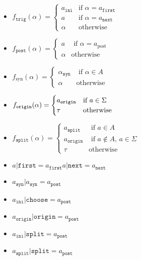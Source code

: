 \documentclass[../hons_project.tex]{subfiles}
\begin{document}
\begin{multicols}{2}
	\begin{itemize}[leftmargin=*]
		\item $f_{\mathtt{trig}}(\alpha) = \begin{cases}
				      a_{\mathtt{ini}} & \text{if } \alpha = a_{\mathtt{first}} \\
				      a                & \text{if } \alpha = a_{\mathtt{next}}  \\
				      \alpha           & \text{otherwise}
			      \end{cases}$

		\item $f_{\mathtt{post}}(\alpha) = \begin{cases}
				      a      & \text{ if } \alpha = a_{\mathrm{post}} \\
				      \alpha & \text{otherwise}
			      \end{cases}$

		\item $f_{\mathrm{syn}}(\alpha) = \begin{cases}
				      \alpha_{\mathtt{syn}} & \text{ if } \alpha\in A \\
				      \alpha                & \text{otherwise}
			      \end{cases}$

		\item $f_{\mathtt{origin}}(\alpha) = \begin{cases}
				      a_{\mathtt{origin}} & \text{if } a\in\Sigma \\
				      \tau                & \text{otherwise}
			      \end{cases}$
		\item $f_{\mathtt{split}}(\alpha) = \begin{cases}
				      a_{\mathtt{split}}  & \text{ if } a\in A                    \\
				      a_{\mathtt{origin}} & \text{ if } a\not\in A,\, a\in \Sigma \\
				      \tau                & \mathrm{otherwise}
			      \end{cases}$
	\end{itemize}
\end{multicols}
\begin{multicols}{3}
	\begin{itemize}[leftmargin=*]
		\item $a | \mathtt{first} = a_{\mathtt{first}}$\newline $a | \mathtt{next} = a_{\mathtt{next}} $
		\item $a_{\mathtt{syn}} | a_{\mathtt{syn}} = a_{\mathtt{post}}$
		\item $a_{\mathtt{ini}} | \mathtt{choose} = a_{\mathtt{post}}$
		\item $a_{\mathtt{origin}} | \mathtt{origin} = a_{\mathtt{post}}$
		\item $a_{\mathtt{ini}} | \mathtt{split} = a_{\mathtt{post}}$
		\item $a_{\mathtt{split}} | \mathtt{split} = a_{\mathtt{post}}$
	\end{itemize}
\end{multicols}
\end{document}
